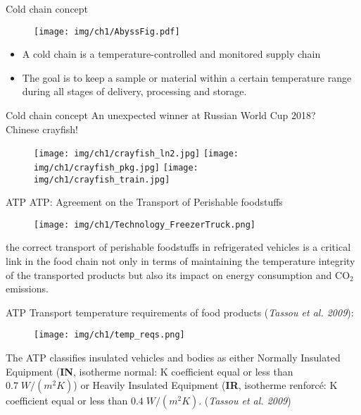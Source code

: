 
\begin{frame}{Cold chain concept}
    \begin{figure}[ht]
        \centering
        \texttt{[image: img/ch1/AbyssFig.pdf]}    
    \end{figure}
    \begin{itemize}
    \item A cold chain is a temperature-controlled and monitored supply chain
    \item The goal is to keep a sample or material within a certain temperature range during all stages of delivery, processing and storage.
    \end{itemize}
\end{frame}


\begin{frame}{Cold chain concept}
An unexpected winner at Russian World Cup 2018? \\
\pause  \alert{Chinese crayfish!}
    \pause
    \begin{figure}[ht]
        \centering
        \texttt{[image: img/ch1/crayfish\_ln2.jpg]}
        \pause
        \texttt{[image: img/ch1/crayfish\_pkg.jpg]}
        \pause
        \texttt{[image: img/ch1/crayfish\_train.jpg]}
    \end{figure}

\end{frame}


\begin{frame}{ATP}
    ATP: Agreement on the Transport of Perishable foodstuffs
    \begin{figure}
        \centering
        \texttt{[image: img/ch1/Technology\_FreezerTruck.png]}
    \end{figure}
    \small{the correct transport of perishable foodstuffs in refrigerated vehicles is a critical link in the food chain not only in terms of maintaining the temperature integrity of the transported products but also its impact on energy consumption and CO$_2$ emissions. }
\end{frame}


\begin{frame}{ATP}
\small{Transport temperature requirements of food products (\textit{Tassou et al. 2009}):}
    \begin{figure}
        \centering
        \texttt{[image: img/ch1/temp\_reqs.png]}
    \end{figure}
    \scriptsize{The ATP classifies insulated vehicles and bodies as either Normally Insulated Equipment (\textbf{IN}, isotherme normal: K coefficient equal or less than $ 0.7\; W/(m^2 K) $) or Heavily Insulated Equipment (\textbf{IR}, isotherme renforcé: K coefficient equal or less than $ 0.4\; W/(m^2 K )$. (\textit{Tassou et al. 2009})}
\end{frame}


